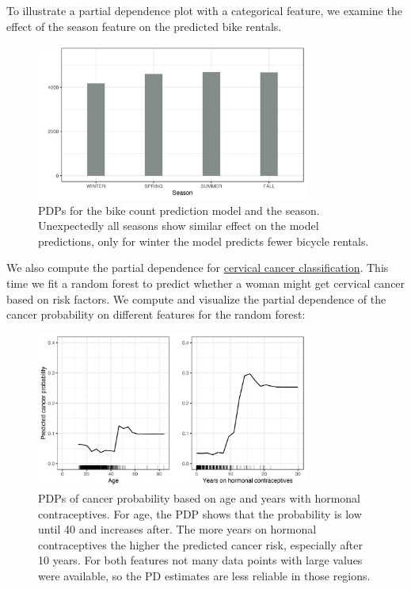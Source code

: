 \documentclass[
  10pt,
]{scrbook}
\begin{document}
To illustrate a partial dependence plot with a categorical feature, we examine the effect of the season feature on the predicted bike rentals.

\begin{figure}

{\centering \includegraphics[width=0.8\textwidth]{images/pdp-bike-cat-1} 

}

\caption{PDPs for the bike count prediction model and the season. Unexpectedly all seasons show similar effect on the model predictions, only for winter the model predicts fewer bicycle rentals.}\label{fig:pdp-bike-cat}
\end{figure}

We also compute the partial dependence for \protect\hyperlink{cervical}{cervical cancer classification}.
This time we fit a random forest to predict whether a woman might get cervical cancer based on risk factors.
We compute and visualize the partial dependence of the cancer probability on different features for the random forest:

\begin{figure}

{\centering \includegraphics[width=0.8\textwidth]{images/pdp-cervical-1} 

}

\caption{PDPs of cancer probability based on age and years with hormonal contraceptives. For age, the PDP shows that the probability is low until 40 and increases after. The more years on hormonal contraceptives the higher the predicted cancer risk, especially after 10 years. For both features not many data points with large values were available, so the PD estimates are less reliable in those regions.}\label{fig:pdp-cervical}
\end{figure}
\end{document}
